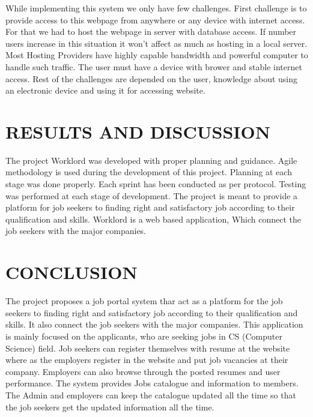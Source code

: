 \documentclass[a4paper,12pt]{report}
\begin{document}
While implementing this system we only have few challenges. First challenge is to provide access to this webpage from anywhere or any device with internet access. For that we had to host the webpage in server with database access. If number users increase in this situation it won't affect as much as hosting in a local server. Most Hosting Providers have highly capable bandwidth and powerful computer to handle such traffic. The user must have a device with brower and stable internet access. Rest of the challenges are depended on the user, knowledge about using an electronic device and using it for accessing website. \\

\pagebreak

\chapter{RESULTS AND DISCUSSION}

The project Worklord was developed with proper planning and guidance. Agile methodology is used during the development of this project. Planning at each stage was done properly. Each sprint has been conducted as per protocol. Testing was performed at each stage of development. The project is meant to provide a platform for job seekers to  finding right and satisfactory job according to their qualification and skills. Worklord is a web based application, Which connect the job seekers with the major companies.

\pagebreak

\chapter{CONCLUSION}

The project  proposes a job portal system thar act as a platform for the job seekers to  finding right and satisfactory job according to their qualification and skills. It also connect the job seekers with the major companies. This application is mainly focused on the applicants, who are seeking jobs in CS (Computer Science) field. Job seekers can register themselves with resume at the website where as the employers register in the website and put job vacancies at their company. Employers can also browse through the posted resumes and user performance. The system provides Jobs catalogue and information to members. The Admin and employers can keep the catalogue updated all the time so that the job seekers get the updated information all the time.\\
\end{document}
